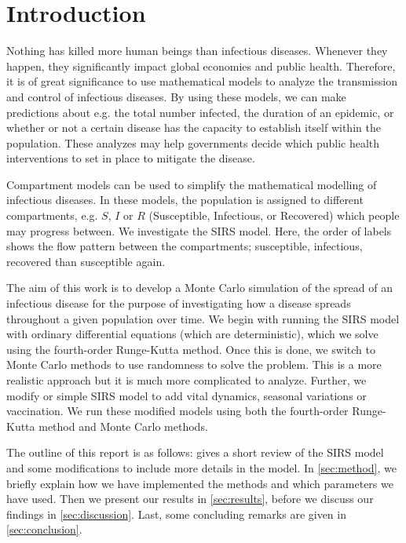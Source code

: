 \documentclass[../main.tex]{subfiles}
\begin{document}
\section{Introduction}\label{sec:introduction}

Nothing has killed more human beings than infectious diseases. Whenever they happen, they significantly impact global economies and public health. Therefore, it is of great significance to use mathematical models to analyze the transmission and control of infectious diseases. By using these models, we can make predictions about e.g. the total number infected, the duration of an epidemic, or whether or not a certain disease has the capacity to establish itself within the population. These analyzes may help governments decide which public health interventions to set in place to mitigate the disease. 

Compartment models can be used to simplify the mathematical modelling of infectious diseases. In these models, the population is assigned to different compartments, e.g. $S$, $I$ or $R$ (Susceptible, Infectious, or Recovered) which people may progress between. We investigate the SIRS model. Here, the order of labels shows the flow pattern between the compartments; susceptible, infectious, recovered than susceptible again. 

The aim of this work is to develop a Monte Carlo simulation of the spread of an infectious disease for the purpose of investigating how a disease spreads throughout a given population over time. We begin with running the SIRS model with ordinary differential equations (which are deterministic), which we solve using the fourth-order Runge-Kutta method. Once this is done, we switch to Monte Carlo methods to use randomness to solve the problem. This is a more realistic approach but it is much more complicated to analyze. Further, we modify or simple SIRS model to add vital dynamics, seasonal variations or vaccination. We run these modified models using both the fourth-order Runge-Kutta method and Monte Carlo methods. 

The outline of this report is as follows:  gives a short review of the SIRS model and some modifications to include more details in the model. In \cref{sec:method}, we briefly explain how we have implemented the methods and which parameters we have used. Then we present our results in \cref{sec:results}, before we discuss our findings in \cref{sec:discussion}. Last, some concluding remarks are given in \cref{sec:conclusion}.
\end{document}
